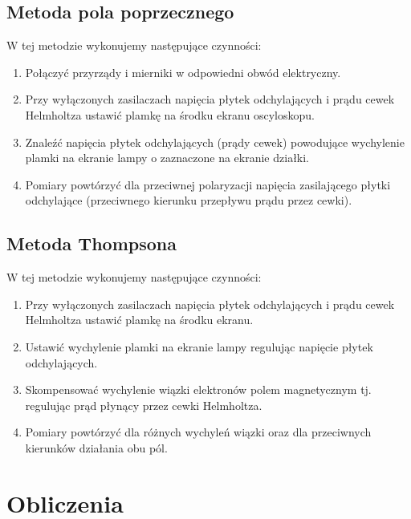 \documentclass[paper=a4, fontsize=12pt]{scrartcl}
\begin{document}
\subsection{Metoda pola poprzecznego}
W tej metodzie wykonujemy następujące czynności:
\begin{enumerate}
\item Połączyć przyrządy i mierniki w odpowiedni obwód elektryczny. 
\item Przy wyłączonych zasilaczach napięcia płytek odchylających i prądu cewek Helmholtza ustawić plamkę na środku ekranu oscyloskopu. 
\item Znaleźć napięcia płytek odchylających (prądy cewek) powodujące wychylenie plamki na ekranie lampy o zaznaczone na ekranie działki. 
\item Pomiary powtórzyć dla przeciwnej polaryzacji napięcia zasilającego płytki odchylające (przeciwnego kierunku przepływu prądu przez cewki).
\end{enumerate}
\subsection{Metoda Thompsona}
W tej metodzie wykonujemy następujące czynności:
\begin{enumerate}
\item Przy wyłączonych zasilaczach napięcia płytek odchylających i prądu cewek Helmholtza ustawić plamkę na środku ekranu. 
\item Ustawić wychylenie plamki na ekranie lampy regulując napięcie płytek odchylających. 
\item Skompensować wychylenie wiązki elektronów polem magnetycznym tj. regulując prąd płynący przez cewki Helmholtza. 
\item Pomiary powtórzyć dla różnych wychyleń wiązki oraz dla przeciwnych kierunków działania obu pól.
\end{enumerate}

\section{Obliczenia}
\end{document}
